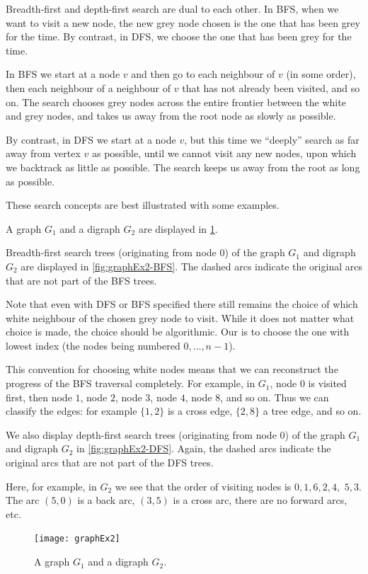 Breadth-first and depth-first search are dual to each other.  In BFS,
when we want to visit a new node, the new grey node chosen is the one
that has been grey for the  time. By contrast, in DFS,
we choose the one that has been grey for the  time.

In BFS we start at a node $v$ and then go to each neighbour of $v$ (in
some order), then each neighbour of a neighbour of $v$ that has not
already been visited, and so on. The search chooses grey nodes across
the entire  frontier between the white and grey nodes, and takes us away
from the root node as slowly as possible.

By contrast, in  DFS we start at a node $v$, but this time we ``deeply''
search as far away from vertex $v$ as possible, until we cannot visit
any new nodes, upon which we backtrack as little as possible. The search
keeps us away from the root as long as possible.

These search concepts are best illustrated with some examples.

\begin{Example}
\label{eg:graphExample2}

A graph $G_1$ and a digraph $G_2$ are displayed in
\cref{fig:graphExample2}.

Breadth-first search trees (originating from node $0$) of the graph $G_1$
and digraph $G_2$  are displayed in \cref{fig:graphEx2-BFS}. The
dashed arcs indicate the original arcs that are not part of the BFS trees.

Note that even with DFS or BFS specified there still remains the choice
of which white neighbour of the chosen grey node to visit. While it does
not matter what choice is made, the choice should be algorithmic.
Our  is to choose the one with
lowest index (the nodes being numbered $0, \dots, n - 1$). 

This convention for choosing white nodes means that we can
reconstruct the progress of the BFS traversal completely. For example,
in $G_1$, node $0$ is visited first, then node $1$, node $2$, node $3$,
node $4$, node $8$, and so on. Thus we can classify the
edges: for example $\{1, 2\}$ is a cross edge, $\{2, 8\}$ a tree edge,
and so on.

We also display depth-first search trees (originating from node $0$) of
the graph $G_1$ and digraph $G_2$ in \cref{fig:graphEx2-DFS}.
Again, the dashed arcs indicate the original arcs that are not part of
the DFS trees.

Here, for example, in $G_2$ we see that the order of visiting nodes is 
$0, 1, 6, 2, 4,$ $5, 3$. The arc $(5, 0)$ is a back arc, $(3, 5)$ is a
cross arc, there are no forward arcs, etc.

\end{Example}
\begin{figure}[hbtp]
	\centering
	\texttt{[image: graphEx2]}
	\caption{A graph $G_1$ and a digraph $G_2$.}
	\label{fig:graphExample2}
\end{figure}

